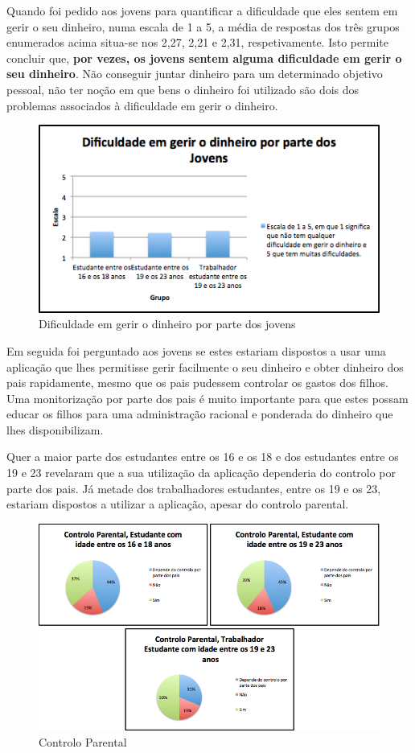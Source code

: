 \documentclass{article}
\begin{document}
      Quando foi pedido aos jovens para quantificar a dificuldade que eles sentem em gerir o seu dinheiro, numa escala de 1 a 5, a média de respostas dos três grupos enumerados acima situa-se nos 2,27, 2,21 e 2,31, respetivamente. Isto permite concluir que,\textbf{ por vezes, os jovens sentem alguma dificuldade em gerir o seu dinheiro}. Não conseguir juntar dinheiro para um determinado objetivo pessoal, não ter noção em que bens o dinheiro foi utilizado são dois dos problemas associados à dificuldade em gerir o dinheiro.

      \begin{figure}[ht!]
        \centering
          \includegraphics[width=0.7\linewidth]{img/img3}
          \caption{Dificuldade em gerir o dinheiro por parte dos jovens}
          \label{img3}
      \end{figure}

      Em seguida foi perguntado aos jovens se estes estariam dispostos a usar uma aplicação que lhes permitisse gerir facilmente o seu dinheiro e obter dinheiro dos pais rapidamente, mesmo que os pais pudessem controlar os gastos dos filhos. Uma monitorização por parte dos pais é muito importante para que estes possam educar os filhos para uma administração racional e ponderada do dinheiro que lhes disponibilizam.

      Quer a maior parte dos estudantes entre os 16 e os 18 e dos estudantes entre os 19 e 23 revelaram que a sua utilização da aplicação dependeria do controlo por parte dos pais. Já metade dos trabalhadores estudantes, entre os 19 e os 23, estariam dispostos a utilizar a aplicação, apesar do controlo parental.

      \begin{figure}[ht!]
        \centering
          \includegraphics[width=0.7\linewidth]{img/img4}
          \caption{Controlo Parental}
          \label{img4}
      \end{figure}      
\end{document}

